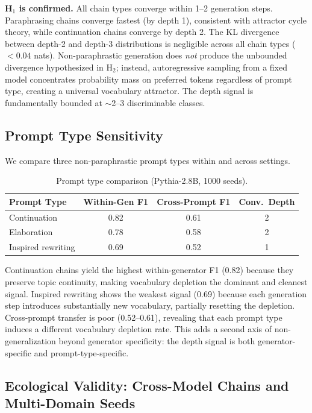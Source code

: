 \documentclass[letterpaper]{article}
\begin{document}
\textbf{H$_1$ is confirmed.} All chain types converge within 1--2 generation steps. Paraphrasing chains converge fastest (by depth 1), consistent with attractor cycle theory, while continuation chains converge by depth 2. The KL divergence between depth-2 and depth-3 distributions is negligible across all chain types ($< 0.04$ nats). Non-paraphrastic generation does \emph{not} produce the unbounded divergence hypothesized in H$_2$; instead, autoregressive sampling from a fixed model concentrates probability mass on preferred tokens regardless of prompt type, creating a universal vocabulary attractor. The depth signal is fundamentally bounded at $\sim$2--3 discriminable classes.

\subsection{Prompt Type Sensitivity}
\label{sec:prompt}

We compare three non-paraphrastic prompt types within and across settings.

\begin{table}[h]
\centering
\caption{Prompt type comparison (Pythia-2.8B, 1000 seeds).}
\label{tab:prompt}
\begin{tabular}{lccc}
\toprule
Prompt Type & Within-Gen F1 & Cross-Prompt F1 & Conv.\ Depth \\
\midrule
Continuation & 0.82 & 0.61 & 2 \\
Elaboration & 0.78 & 0.58 & 2 \\
Inspired rewriting & 0.69 & 0.52 & 1 \\
\bottomrule
\end{tabular}
\end{table}

Continuation chains yield the highest within-generator F1 (0.82) because they preserve topic continuity, making vocabulary depletion the dominant and cleanest signal. Inspired rewriting shows the weakest signal (0.69) because each generation step introduces substantially new vocabulary, partially resetting the depletion. Cross-prompt transfer is poor (0.52--0.61), revealing that each prompt type induces a different vocabulary depletion rate. This adds a second axis of non-generalization beyond generator specificity: the depth signal is both generator-specific and prompt-type-specific.

\subsection{Ecological Validity: Cross-Model Chains and Multi-Domain Seeds}
\label{sec:ecological}
\end{document}
